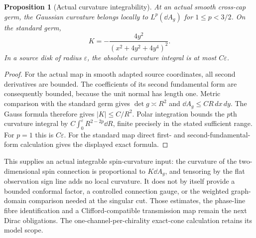 \documentclass[11pt]{article}
\newtheorem{proposition}[theorem]{Proposition}
\theoremstyle{remark}\newtheorem{remark}[theorem]{Remark}
\begin{document}
\begin{proposition}[Actual curvature integrability]\label{prop:curvature}
At an actual smooth cross-cap germ, the Gaussian curvature belongs locally
to $L^p(\dd A_g)$ for $1\leq p<3/2$. On the standard germ,
\[
 K=-\frac{4y^2}{(x^2+4y^2+4y^4)^2}.
\]
In a source disk of radius $\varepsilon$, the absolute curvature integral
is at most $C\varepsilon$.
\end{proposition}
\begin{proof}
For the actual map in smooth adapted source coordinates, all second
derivatives are bounded. The coefficients of its second fundamental form
are consequently bounded, because the unit normal has length one.
Metric comparison with the standard germ gives $\det g\asymp R^2$ and
$\dd A_g\leq C R\,dx\,dy$. The Gauss formula therefore gives
$|K|\leq C/R^2$. Polar integration bounds the $p$th curvature integral by
$C\int_0^\varepsilon R^{2-2p}\dd R$, finite precisely in the stated sufficient
range. For $p=1$ this is $C\varepsilon$.
For the standard map direct first- and second-fundamental-form calculation
gives the displayed exact formula.
\end{proof}

This supplies an actual integrable spin-curvature input: the curvature of
the two-dimensional spin connection is proportional to $K\dd A_g$,
and tensoring by the flat observation sign line adds no local curvature.
It does not by itself provide a bounded conformal factor, a controlled
connection gauge, or the weighted graph-domain comparison needed at the
singular cut. Those estimates, the phase-line fibre identification and a
Clifford-compatible transmission map remain the next Dirac obligations.
The one-channel-per-chirality exact-cone calculation retains its model scope.
\end{document}
